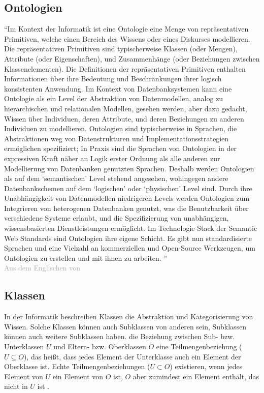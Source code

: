 \subsection{Ontologien}
\label{sub:ontology}
\enquote{Im Kontext der Informatik ist eine Ontologie eine Menge von repräsentativen Primitiven, welche einen Bereich des Wissens oder eines Diskurses modellieren.
Die repräsentativen Primitiven sind typischerweise Klassen (oder Mengen), Attribute (oder Eigenschaften), und Zusammenhänge (oder Beziehungen zwischen Klassenelementen).
Die Definitionen der repräsentativen Primitiven enthalten Informationen über ihre Bedeutung und Beschränkungen ihrer logisch konsistenten Anwendung.
Im Kontext von Datenbanksystemen kann eine Ontologie als ein Level der Abstraktion von Datenmodellen, analog zu hierarchischen und relationalen Modellen,
gesehen werden, aber dazu gedacht, Wissen über Individuen, deren Attribute, und deren Beziehungen zu anderen Individuen zu modellieren.
Ontologien sind typischerweise in Sprachen, die Abstraktionen weg von Datenstrukturen und Implementationsstrategien ermöglichen spezifiziert;
In Praxis sind die Sprachen von Ontologien in der expressiven Kraft näher an Logik erster Ordnung als alle anderen zur Modellierung von Datenbanken genutzten Sprachen.
Deshalb werden Ontologien als auf dem \enquote{semantischen} Level stehend angesehen, wohingegen andere Datenbankschemen auf dem \enquote{logischen} oder \enquote{physischen} Level sind.
Durch ihre Unabhängigkeit von Datenmodellen niedrigeren Levels werden Ontologien zum Integrieren von heterogenen Datenbanken genutzt,
was die Benutzbarkeit über verschiedene Systeme erlaubt, und die Spezifizierung von unabhängigen, wissensbasierten  Dienstleistungen ermöglicht.
Im Technologie-Stack der Semantic Web Standards sind Ontologien ihre eigene Schicht.
Es gibt nun standardisierte Sprachen und eine Vielzahl an kommerziellen und Open-Source Werkzeugen, um Ontologien zu erstellen und mit ihnen zu arbeiten.
}\\
\textcolor{darkgray}{Aus dem Englischen von \citet{ontologygruber}}

\subsection{Klassen}

In der Informatik beschreiben Klassen die Abstraktion und Kategorisierung von Wissen.
Solche Klassen können auch Subklassen von anderen sein, Subklassen können auch weitere Subklassen haben.
die Beziehung zwischen Sub- bzw. Unterklassen $U$ und Eltern- bzw. Oberklassen $O$ eine Teilmengenbeziehung ($U \subseteq O$),
das heißt, dass jedes Element der Unterklasse auch ein Element der Oberklasse ist.
Echte Teilmengenbeziehungen ($U \subset O$) existieren, wenn jedes Element von $U$ ein Element von $O$ ist, $O$ aber zumindest ein Element enthält,
das nicht in $U$ ist \citep[S.~261]{semanticwebgrundlagen}.

